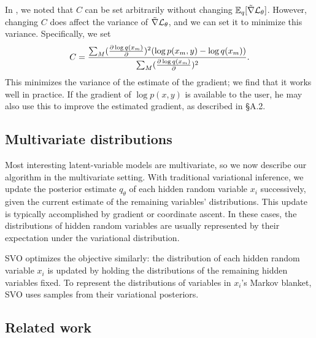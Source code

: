 In , we noted that $C$ can be
set arbitrarily without changing $\textstyle \mathbb{E}_{q} [ {\tilde
  \nabla \cal{L}_{\theta}} ]$.  However, changing $C$ does affect the
variance of $\tilde \nabla \cal{L}_{\theta}$, and we can set it to
minimize this variance. Specifically, we set
\begin{equation}                                                                      
  C = \frac{\sum_M                                                                       
    (\frac{\partial  \log q(x_m)}{\partial })^2 ( \log p(x_m, y) - \log q(x_m) ) } {                          
    \sum_M (\frac{\partial \log q(x_m)}{\partial })^2}.                                                                    
\end{equation}
This minimizes the variance of the estimate of the gradient; we find
that it works well in practice.  If the gradient of $\log p(x, y)$ is
available to the user, he may also use this to improve the estimated
gradient, as described in \S A.2.

\subsection{Multivariate distributions}
Most interesting latent-variable models are multivariate, so we now describe
our algorithm in the multivariate setting.  With traditional variational
inference, we update the posterior estimate $q_\theta$ of each hidden
random variable $x_i$ successively, given the current estimate of the
remaining variables' distributions.  This update is typically
accomplished by gradient or coordinate ascent.  In these cases, the
distributions of hidden random variables are usually represented by
their expectation under the variational distribution.

SVO optimizes the objective similarly: the distribution of each hidden
random variable $x_i$ is updated by holding the distributions of the
remaining hidden variables fixed.  To represent the distributions of
variables in $x_i$'s Markov blanket, SVO uses samples from their
variational posteriors.

\subsection*{Related work}

